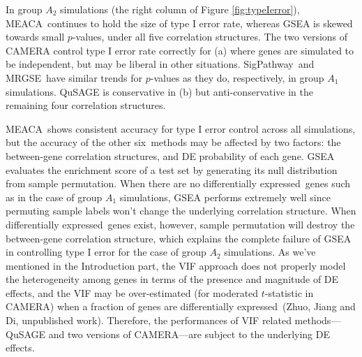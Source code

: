 \documentclass[a4,center,fleqn]{NAR}
\newcommand{\OurMethod}{MEACA}
\newcommand{\HowmanyTest}{six}
\newcommand{\aaCase}{a}
\newcommand{\aCase}{c}
\newcommand{\cCase}{b}
\newcommand{\fCase}{e}
\newcommand{\CMR}{CAMERA-rank}
\newcommand{\CMT}{CAMERA-modt}
\newcommand{\gent}{SigPathway}
\newcommand{\genr}{MRGSE}
\newcommand{\thepapertobefinished}{Zhuo, Jiang and Di, unpublished work}
\newcommand{\DED}{differentially expressed}
\begin{document}
	In group $A_2$ simulations (the right column of Figure \ref{fig:typeIerror}),  
	\OurMethod~continues to hold the size of type I error rate, whereas GSEA is skewed towards 
	small $p$-values, under all five correlation structures. The two versions of CAMERA control 
	type I error rate correctly for	(\aaCase) where genes are simulated to be independent, but may 
	be liberal in other situations.
	\gent~and \genr~have similar trends for $p$-values as they do, respectively, in group $A_1$
	simulations. QuSAGE is conservative in (\cCase) but anti-conservative in the remaining four
	correlation structures.
	
	
	\OurMethod~shows consistent accuracy for type I error control across all simulations, but the
	accuracy of the other \HowmanyTest~methods may be affected by two factors: the between-gene
	correlation structures, and DE probability of each gene. %
	GSEA evaluates the enrichment score
	of a test set by generating its null distribution from sample permutation. When there are no 
	\DED~genes such as in the case of group $A_1$ simulations, GSEA performs extremely well since 
	permuting sample labels won't change the underlying correlation structure. When \DED~genes 
	exist, 
	however, sample	permutation will destroy the between-gene correlation structure, which 
	explains the complete failure of GSEA in controlling type I error for the case of group $A_2$ 
	simulations. As we've mentioned in the Introduction part, the VIF approach does not properly 
	model the heterogeneity among genes in terms of the presence and magnitude of DE effects, and 
	the VIF may be over-estimated (for moderated $t$-statistic in CAMERA)  when a fraction of genes 
	are \DED~(\thepapertobefinished). Therefore, the 
	performances of VIF related methods---QuSAGE and two versions of
	CAMERA---are subject to the underlying DE effects. 
	
\end{document}
